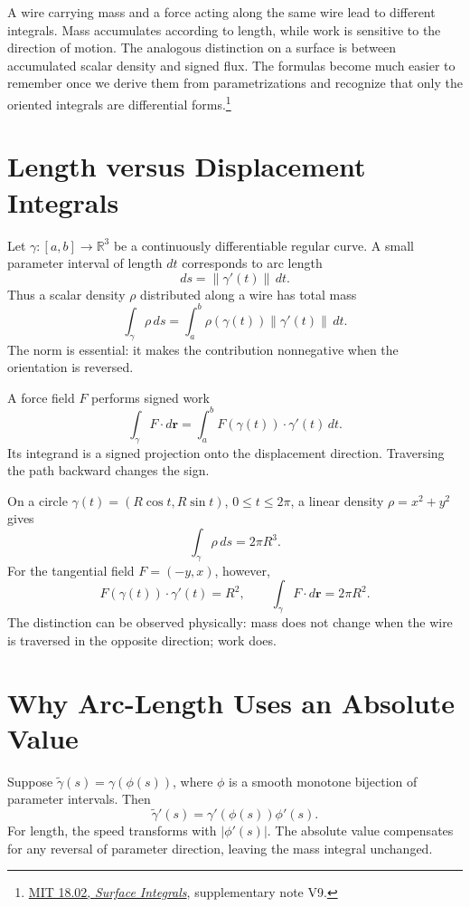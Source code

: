 
A wire carrying mass and a force acting along the same wire lead to different integrals. Mass accumulates according to length, while work is sensitive to the direction of motion. The analogous distinction on a surface is between accumulated scalar density and signed flux. The formulas become much easier to remember once we derive them from parametrizations and recognize that only the oriented integrals are differential forms.\footnote{\href{https://ocw.mit.edu/courses/18-02-multivariable-calculus-fall-2007/resources/surface_integrls/}{MIT 18.02, \emph{Surface Integrals}}, supplementary note V9.}

\section{Length versus Displacement Integrals}

Let \(\gamma:[a,b]\to\mathbb R^3\) be a continuously differentiable regular curve. A small parameter interval of length \(dt\) corresponds to arc length
\[
 ds=\|\gamma'(t)\|\,dt.
\]
Thus a scalar density \(\rho\) distributed along a wire has total mass
\[
 \boxed{\int_\gamma\rho\,ds
       =\int_a^b\rho(\gamma(t))\|\gamma'(t)\|\,dt.}
\]
The norm is essential: it makes the contribution nonnegative when the orientation is reversed.

A force field \(F\) performs signed work
\[
 \boxed{\int_\gamma F\cdot d\mathbf r
       =\int_a^b F(\gamma(t))\cdot\gamma'(t)\,dt.}
\]
Its integrand is a signed projection onto the displacement direction. Traversing the path backward changes the sign.

On a circle \(\gamma(t)=(R\cos t,R\sin t)\), \(0\le t\le2\pi\), a linear density \(\rho=x^2+y^2\) gives
\[
 \int_\gamma\rho\,ds=2\pi R^3.
\]
For the tangential field \(F=(-y,x)\), however,
\[
 F(\gamma(t))\cdot\gamma'(t)=R^2,\qquad
 \int_\gamma F\cdot d\mathbf r=2\pi R^2.
\]
The distinction can be observed physically: mass does not change when the wire is traversed in the opposite direction; work does.

\section{Why Arc-Length Uses an Absolute Value}

Suppose \(\widetilde\gamma(s)=\gamma(\phi(s))\), where \(\phi\) is a smooth monotone bijection of parameter intervals. Then
\[
 \widetilde\gamma'(s)=\gamma'(\phi(s))\phi'(s).
\]
For length, the speed transforms with \(|\phi'(s)|\). The absolute value compensates for any reversal of parameter direction, leaving the mass integral unchanged.

